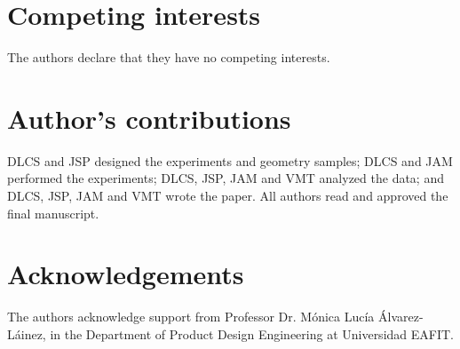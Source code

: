 \documentclass[twocolumn]{bmcart}%
\begin{document}


\begin{backmatter}

\section*{Competing interests}
  The authors declare that they have no competing interests.

\section*{Author's contributions}

DLCS and JSP  designed the experiments and geometry samples; DLCS and  JAM performed the experiments; DLCS, JSP, JAM and VMT analyzed the data;  and DLCS, JSP, JAM and VMT wrote the paper. All authors read and approved the final manuscript.


\section*{Acknowledgements}

The authors acknowledge support from Professor Dr. Mónica Lucía Álvarez-Láinez, in the Department of Product Design Engineering at Universidad EAFIT.



\end{backmatter}
\end{document}
